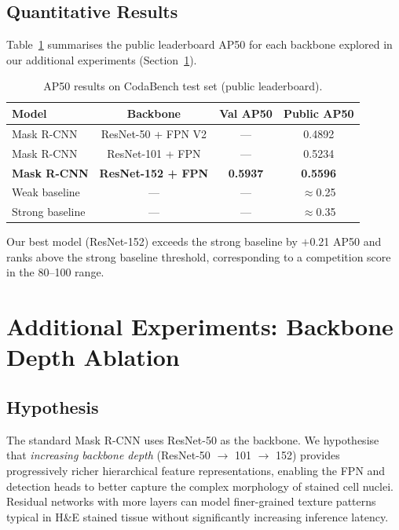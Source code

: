 \documentclass[11pt]{article}
\begin{document}
\subsection{Quantitative Results}

Table~\ref{tab:results} summarises the public leaderboard AP50 for each
backbone explored in our additional experiments (Section~\ref{sec:additional}).

\begin{table}[H]
\centering
\caption{AP50 results on CodaBench test set (public leaderboard).}
\label{tab:results}
\begin{tabular}{lccc}
\toprule
\textbf{Model} & \textbf{Backbone} & \textbf{Val AP50} & \textbf{Public AP50} \\
\midrule
Mask R-CNN     & ResNet-50  + FPN V2 & ---    & 0.4892 \\
Mask R-CNN     & ResNet-101 + FPN    & ---    & 0.5234 \\
\textbf{Mask R-CNN} & \textbf{ResNet-152 + FPN} & \textbf{0.5937} & \textbf{0.5596} \\
\midrule
Weak baseline  & ---               & ---    & $\approx$0.25 \\
Strong baseline & ---              & ---    & $\approx$0.35 \\
\bottomrule
\end{tabular}
\end{table}

Our best model (ResNet-152) exceeds the strong baseline by $+$0.21
AP50 and ranks above the strong baseline threshold, corresponding to
a competition score in the 80--100 range.

\section{Additional Experiments: Backbone Depth Ablation}
\label{sec:additional}

\subsection{Hypothesis}

The standard Mask R-CNN uses ResNet-50 as the backbone. We hypothesise
that \emph{increasing backbone depth} (ResNet-50 $\to$ 101 $\to$ 152)
provides progressively richer hierarchical feature representations,
enabling the FPN and detection heads to better capture the complex
morphology of stained cell nuclei. Residual networks with more layers
can model finer-grained texture patterns typical in H\&E stained tissue
without significantly increasing inference latency.
\end{document}
